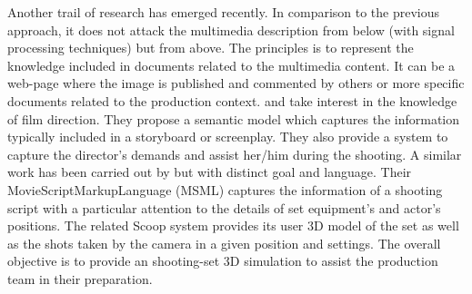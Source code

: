  


Another trail of research has emerged recently. 
In comparison to the previous approach, it does not attack the multimedia description from below (with signal processing techniques) but from above. 
The principles is to represent the knowledge included in documents related to the multimedia content. 
It can be a web-page where the image is published and commented by others \cite{Simperl2009} or more specific documents related to the production context. 
\cite{Chakravarthy2009b} and \cite{Chakravarthy2009c} take interest in the knowledge of film direction. 
They propose a semantic model which captures the information typically included in a storyboard or screenplay. 
They also provide a system to capture the director's demands and assist her/him during the shooting. 
A similar work has been carried out by \cite{VanRijsselbergen2009} but with distinct goal and language. 
Their MovieScriptMarkupLanguage (MSML) captures the information of a shooting script with a particular attention to the details of set equipment's and actor's positions. 
The related Scoop system \cite{Cardinaels2008} provides its user 3D model of the set as well as the shots taken by the camera in a given position and settings. 
The overall objective is to provide an shooting-set 3D simulation to assist the production team in their preparation.\\







